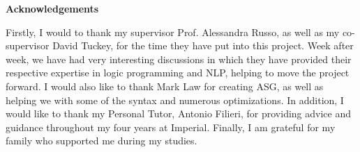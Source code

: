 \newenvironment{acknowledgements}
    {\thispagestyle{plain}\null\vfill\begin{center}
    \bfseries Acknowledgements\end{center}}
    {\vfill\null}
        \begin{acknowledgements}
        Firstly, I would to thank my supervisor Prof. Alessandra Russo, as well as my co-supervisor David Tuckey, for the time they have put into this project. Week after week, we have had very interesting discussions in which they have provided their respective expertise in logic programming and NLP, helping to move the project forward. I would also like to thank Mark Law for creating ASG, as well as helping we with some of the syntax and numerous optimizations. In addition, I would like to thank my Personal Tutor, Antonio Filieri, for providing advice and guidance throughout my four years at Imperial. Finally, I am grateful for my family who supported me during my studies.
        \end{acknowledgements}